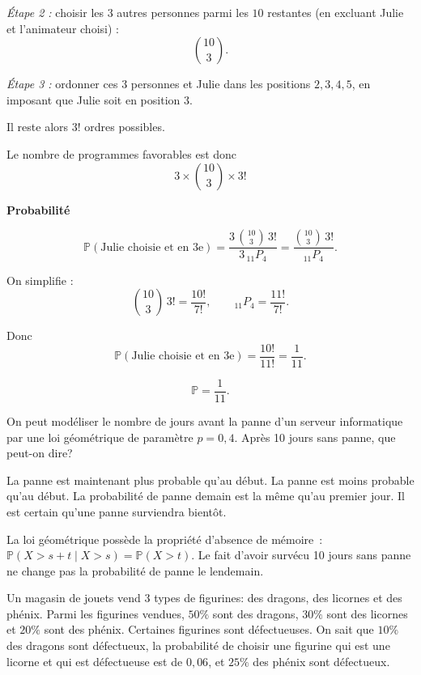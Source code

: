 \begin{questions}
\begin{solution}
\emph{Étape 2 :} choisir les \(3\) autres personnes parmi les \(10\) restantes (en excluant Julie et l’animateur choisi) :
\[
\binom{10}{3}.
\]

\emph{Étape 3 :} ordonner ces \(3\) personnes et Julie dans les positions
\(2,3,4,5\), en imposant que Julie soit en position \(3\).

Il reste alors \(3!\) ordres possibles.

Le nombre de programmes favorables est donc
\[
3\times \binom{10}{3}\times 3!
\]

\medskip
\textbf{Probabilité}

\[
\mathbb{P}(\text{Julie choisie et en 3e})
=
\frac{3\,\binom{10}{3}\,3!}{3\,{}_{11}P_{4}}
=
\frac{\binom{10}{3}\,3!}{{}_{11}P_{4}}.
\]

On simplifie :
\[
\binom{10}{3}\,3!
=
\frac{10!}{7!},
\qquad
{}_{11}P_{4}=\frac{11!}{7!}.
\]

Donc
\[
\mathbb{P}(\text{Julie choisie et en 3e})
=
\frac{10!}{11!}
=
\frac{1}{11}.
\]

\[
\boxed{\mathbb{P}=\frac{1}{11}.}
\]
\end{solution}

\vspace{12.5cm}

\question[2]

On peut modéliser le nombre de jours avant la panne d'un serveur informatique par une loi géométrique de paramètre $p=0{,}4$. Après 10 jours sans panne, que peut-on dire?

\begin{checkboxes}
\choice La panne est maintenant plus probable qu'au début.
\choice La panne est moins probable qu'au début.
\correctchoice La probabilité de panne demain est la même qu'au premier jour.
\choice Il est certain qu'une panne surviendra bientôt.
\end{checkboxes}
\begin{solution}
La loi géométrique possède la propriété d'absence de mémoire~: $\mathbb{P}(X > s+t \mid X > s) = \mathbb{P}(X > t)$. Le fait d'avoir survécu 10 jours sans panne ne change pas la probabilité de panne le lendemain.
\end{solution}


\newpage
\question[]

Un magasin de jouets vend 3 types de figurines: des dragons, des licornes et des phénix. Parmi les figurines vendues, $50\%$ sont des dragons, $30\%$ sont des licornes et $20\%$ sont des phénix. Certaines figurines sont défectueuses. On sait que $10\%$ des dragons sont défectueux, la probabilité de choisir une figurine qui est une licorne et qui est défectueuse est de $0{,}06$, et $25\%$ des phénix sont défectueux.


\end{questions}
